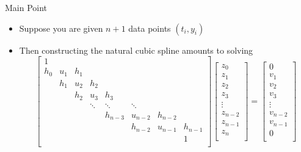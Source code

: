 \documentclass[10pt]{beamer}
\begin{document}
\begin{frame}{Main Point}
    \begin{itemize}
        \item Suppose you are given $n+1$ data points $(t_i,y_i)$

        \item Then constructing the natural cubic spline amounts to solving 
        \[
\begin{bmatrix}
 1 &  & & & & & & \\ 
 h_0 & u_1  & h_1 & & & & & \\ 
 & h_1            &  u_2 & h_2 & & & & \\ 
 &                & h_2             & u_3 & h_3  & & & \\ 
 &                &                 & \ddots  & \ddots & \ddots & & \\  
 &  &   &   & h_{n-3} & u_{n-2} & h_{n-2}  & \\ 
 &  &   &   &         & h_{n-2} &  u_{n-1}& h_{n-1}\\
 &  &   &   &         &         &        & 1\\
\end{bmatrix}
\begin{bmatrix}
z_0\\z_1\\  z_2\\  z_3\\  \vdots\\  z_{n-2}\\  z_{n-1}\\z_n\\
\end{bmatrix}
 = 
\begin{bmatrix}
0\\v_1\\  v_2\\  v_3\\  \vdots\\  v_{n-2}\\  v_{n-1}\\0\\
\end{bmatrix}
\] 
    \end{itemize}
\end{frame}
\end{document}
